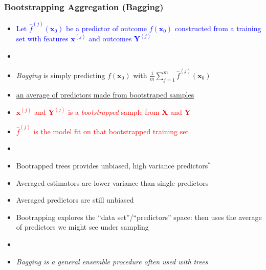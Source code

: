 \documentclass[xcolor={dvipsnames}]{beamer}
\begin{document}
\frame
{
 \frametitle{Bootstrapping Aggregation (Bagging)}
\begin{itemize}
\item<1-> \textcolor{blue}{Let $\hat f^{(j)}({\boldsymbol x}_0)$ be a predictor of outcome $f({\boldsymbol x}_0)$ constructed 
from a training set with features ${\boldsymbol x}^{(j)}$ and outcomes ${\boldsymbol Y}^{(j)}$}
\item[]
\item<2-> \emph{Bagging} is simply predicting $f({\boldsymbol x}_0)$ with $\displaystyle \frac{1}{m} \sum_{j=1}^m \hat f^{(j)}({\boldsymbol x}_0)$
\item<2->[] \underline{an average of predictors made from bootstraped samples}
\item<3->  \textcolor{red}{${\boldsymbol x}^{(j)}$ and ${\boldsymbol Y}^{(j)}$  is a \emph{bootstrapped} sample from ${\boldsymbol X}$ and ${\boldsymbol Y}$}
\item<3->  \textcolor{red}{$\hat f^{(j)}$ is the model fit on that bootstrapped training set}
\item<3->[] %
\item<4->[1.] Bootrapped trees provides unbiased, high variance predictors$^*$  
\item<5->[2.] Averaged estimators are lower variance than single predictors 
\item<6->[3.] Averaged predictors are still unbiased 
\item<7->[4.] Bootrapping explores the ``data set''/``predictors'' space:
then uses the average of predictors we might see under sampling
\item[]
\item<8->[$^*$]\emph{Bagging is a general ensemble procedure often used with trees}
\end{itemize}
}
\end{document}
